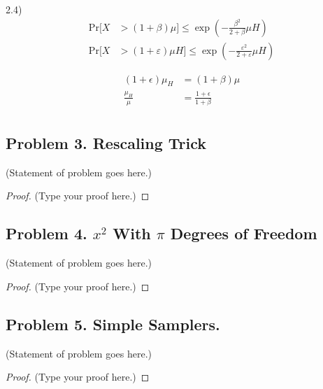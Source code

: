 \documentclass[12pt]{article}
\begin{document}
	2.4)
	\begin{align*}
		\mathrm{Pr}[X &> (1+\beta)\mu]\leq\exp\left(-\frac{\beta^{2}}{2+\beta}\mu H\right) \\
		\mathrm{Pr}[X &> (1+\varepsilon)\mu H]\leq\exp\left(-\frac{\varepsilon^{2}}{2+\varepsilon}\mu H\right)
	\end{align*}

	\begin{align*}
		(1 + \epsilon) \mu_{H} &= (1 + \beta) \mu \\
		\frac{\mu_{H}}{\mu} &= \frac{1 + \epsilon}{1 + \beta}\\
	\end{align*}
	\vspace{2in} %
	
	
	\subsection*{Problem 3. Rescaling Trick}
	(Statement of problem goes here.)\\
	
	\begin{proof}
		(Type your proof here.)
	\end{proof}
	
	\vspace{2in} %
	
	
	
	\subsection*{Problem 4. $x^2$ With $\pi$ Degrees of Freedom}
	(Statement of problem goes here.)\\
	
	\begin{proof}
		(Type your proof here.)
	\end{proof}
	
	\vspace{2in} %
	
	
	\subsection*{Problem 5. Simple Samplers.}
	(Statement of problem goes here.)\\
	
	\begin{proof}
		(Type your proof here.)
	\end{proof}
	
\end{document}
